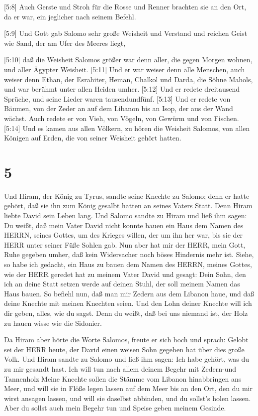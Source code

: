  {[}5:8{]} Auch Gerste und Stroh für die Rosse und Renner
brachten sie an den Ort, da er war, ein jeglicher nach seinem Befehl.

 {[}5:9{]} Und Gott gab Salomo sehr große Weisheit und
Verstand und reichen Geist wie Sand, der am Ufer des Meeres liegt,

 {[}5:10{]} daß die Weisheit Salomos größer war denn aller,
die gegen Morgen wohnen, und aller Ägypter Weisheit. 
{[}5:11{]} Und er war weiser denn alle Menschen, auch weiser denn Ethan,
der Esrahiter, Heman, Chalkol und Darda, die Söhne Mahols, und war
berühmt unter allen Heiden umher.  {[}5:12{]} Und er redete
dreitausend Sprüche, und seine Lieder waren tausendundfünf.
 {[}5:13{]} Und er redete von Bäumen, von der Zeder an auf
dem Libanon bis an Isop, der aus der Wand wächst. Auch redete er von
Vieh, von Vögeln, von Gewürm und von Fischen.  {[}5:14{]}
Und es kamen aus allen Völkern, zu hören die Weisheit Salomos, von allen
Königen auf Erden, die von seiner Weisheit gehört hatten.

\hypertarget{section-4}{%
\section{5}\label{section-4}}

 Und Hiram, der König zu Tyrus, sandte seine Knechte zu
Salomo; denn er hatte gehört, daß sie ihn zum König gesalbt hatten an
seines Vaters Statt. Denn Hiram liebte David sein Leben lang.
 Und Salomo sandte zu Hiram und ließ ihm sagen: 
Du weißt, daß mein Vater David nicht konnte bauen ein Haus dem Namen des
HERRN, seines Gottes, um des Krieges willen, der um ihn her war, bis sie
der HERR unter seiner Füße Sohlen gab.  Nun aber hat mir der
HERR, mein Gott, Ruhe gegeben umher, daß kein Widersacher noch böses
Hindernis mehr ist.  Siehe, so habe ich gedacht, ein Haus zu
bauen dem Namen des HERRN, meines Gottes, wie der HERR geredet hat zu
meinem Vater David und gesagt: Dein Sohn, den ich an deine Statt setzen
werde auf deinen Stuhl, der soll meinem Namen das Haus bauen.
 So befiehl nun, daß man mir Zedern aus dem Libanon haue,
und daß deine Knechte mit meinen Knechten seien. Und den Lohn deiner
Knechte will ich dir geben, alles, wie du sagst. Denn du weißt, daß bei
uns niemand ist, der Holz zu hauen wisse wie die Sidonier.

 Da Hiram aber hörte die Worte Salomos, freute er sich hoch
und sprach: Gelobt sei der HERR heute, der David einen weisen Sohn
gegeben hat über dies große Volk.  Und Hiram sandte zu
Salomo und ließ ihm sagen: Ich habe gehört, was du zu mir gesandt hast.
Ich will tun nach allem deinem Begehr mit Zedern-und Tannenholz
 Meine Knechte sollen die Stämme vom Libanon hinabbringen
ans Meer, und will sie in Flöße legen lassen auf dem Meer bis an den
Ort, den du mir wirst ansagen lassen, und will sie daselbst abbinden,
und du sollst's holen lassen. Aber du sollst auch mein Begehr tun und
Speise geben meinem Gesinde.

